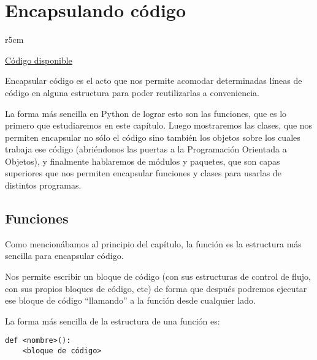 

\chapter{Encapsulando código}

\begin{wraptable}{r}{5cm}
\begin{modulesinfo}
\begin{center}
{\small
    \href{https://github.com/facundobatista/libro-pyciencia/tree/master/código/py_encapsulando/}{Código disponible}
}
\end{center}
\end{modulesinfo}
\end{wraptable}

Encapsular código es el acto que nos permite acomodar determinadas líneas de código en alguna estructura para poder reutilizarlas a conveniencia.

La forma más sencilla en Python de lograr esto son las funciones, que es lo primero que estudiaremos en este capítulo. Luego mostraremos las clases, que nos permiten encapsular no sólo el código sino también los objetos sobre los cuales trabaja ese código (abriéndonos las puertas a la Programación Orientada a Objetos), y finalmente hablaremos de módulos y paquetes, que son capas superiores que nos permiten encapsular funciones y clases para usarlas de distintos programas.


\section{Funciones}\label{sec:funciones}

Como mencionábamos al principio del capítulo, la función es la estructura más sencilla para encapsular código. 

Nos permite escribir un bloque de código (con sus estructuras de control de flujo, con sus propios bloques de código, etc) de forma que después podremos ejecutar ese bloque de código ``llamando'' a la función desde cualquier lado.

La forma más sencilla de la estructura de una función es:

\begin{verbatim}
def <nombre>():
    <bloque de código>
\end{verbatim}

